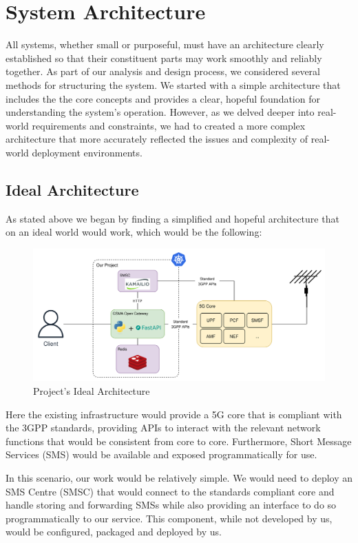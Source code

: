 \chapter{System Architecture}

All systems, whether small or purposeful, must have an architecture clearly established so that their constituent parts may work smoothly and reliably together. As part of our analysis and design process, we considered several methods for structuring the system. We started with a simple architecture that includes the the core concepts and provides a clear, hopeful foundation for understanding the system’s operation. However, as we delved deeper into real-world requirements and constraints, we had to created a more complex architecture that more accurately reflected the issues and complexity of real-world deployment environments.

\section{Ideal Architecture}

As stated above we began by finding a simplified and hopeful architecture that on an ideal world would work, which would be the following:


\begin{figure}[H]
	\centerline{
		\includegraphics[width=15cm]{figs/IdealArchitecture.png}
	}
	\caption{Project's Ideal Architecture}
\end{figure}

Here the existing infrastructure would provide a 5G core that is compliant with the 3GPP standards, providing APIs to interact with the relevant network functions that would be consistent from core to core. Furthermore, Short Message Services (SMS) would be available and exposed programmatically for use.

In this scenario, our work would be relatively simple. We would need to deploy an SMS Centre (SMSC) that would connect to the standards compliant core and handle storing and forwarding SMSs while also providing an interface to do so programmatically to our service. This component, while not developed by us, would be configured, packaged and deployed by us.

